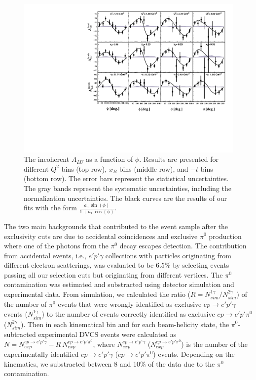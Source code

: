 \documentclass[twocolumn,nofootinbib,prl,superscriptaddress,secnumarabic,amssymb,nobibnotes,aps,floatfix]{revtex4}
\begin{document}
\begin{figure}[t!]
\includegraphics[width=13.9cm]{figs/incoherent_ALU_phi.pdf}
\caption{The incoherent $A_{LU}$ as a function of $\phi$. Results are presented
   for different $Q^{2}$ bins (top row), $x_{B}$ bins (middle row), and $-t$ 
   bins (bottom row). The error bars represent the statistical uncertainties.  
   The gray bands represent the systematic uncertainties, including the 
   normalization uncertainties. The black curves are the results of our fits 
   with the form $\frac{a_{0}~\sin(\phi)}{1+ a_{1}~\cos(\phi)}$.}
\label{fig:alu}
\end{figure}


The two main backgrounds that contributed to the event sample after the 
exclusivity cuts are due to accidental coincidences and exclusive $\pi^0$ 
production where one of the photons from the $\pi^0$ decay escapes detection.  
The contribution from accidental events, i.e., $e'p'\gamma$ collections with 
particles originating from different electron scatterings, was evaluated to be 
6.5\% by selecting events passing all our selection cuts but originating from 
different vertices. The $\pi^0$ contamination was estimated and substracted using detector 
simulation and experimental data. From simulation, we calculated the ratio ($R 
= N^{1\gamma}_{sim}/N^{2\gamma}_{sim}$) of the number of $\pi^0$ events that 
were wrongly identified as exclusive $ep\rightarrow e'p'\gamma$ events ($N^{1\gamma}_{sim}$) to the 
number of events correctly identified as exclusive $ep\rightarrow e'p'\pi^0$ ($N^{2\gamma}_{sim}$).  
Then in each kinematical bin and for each beam-helicity state, the 
$\pi^0$-subtracted experimental DVCS events were calculated as $N = 
N^{ep\rightarrow e'p'\gamma}_{exp}- R~N^{ep\rightarrow e'p'\pi^0}_{exp}$, where 
$N^{ep\rightarrow e'p'\gamma}_{exp}$ ($N^{ep\rightarrow e'p'\pi^0}_{exp}$) is 
the number of the experimentally identified $ep\rightarrow e'p'\gamma$ 
($ep\rightarrow e'p'\pi^0$) events. Depending on the kinematics, we substracted
between 8 and 10\% of the data due to the $\pi^0$ contamination. 
\end{document}
